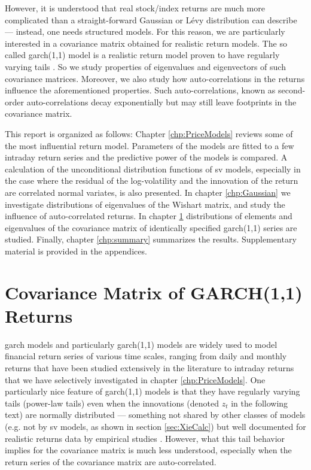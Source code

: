 \documentclass{report}
\begin{document}
However, it is understood that real stock/index returns are much more
complicated than a straight-forward Gaussian or L\'evy distribution can
describe --- instead, one needs structured models. For this reason, we
are particularly interested in a covariance matrix obtained for
realistic return models. The so called \gls{garch}(1,1) model is a realistic
return model proven to have regularly varying tails
\cite{mikosch2000}. So we study properties of eigenvalues and
eigenvectors of such covariance matrices. Moreover, we also study how
auto-correlations in the returns influence the aforementioned
properties. Such auto-correlations, known as second-order
auto-correlations decay exponentially but may still leave footprints
in the covariance matrix.

This report is organized as follows: Chapter \ref{chp:PriceModels}
reviews some of the most influential return model. Parameters of the
models are fitted to a few intraday return series and the predictive
power of the models is compared. A calculation of the
unconditional distribution functions of \gls{sv} models,
especially in the case where the residual of the log-volatility
and the innovation of the return are correlated normal variates, is
also presented. In chapter \ref{chp:Gaussian} we investigate
distributions of eigenvalues of the Wishart matrix, and study the
influence of auto-correlated returns. In chapter
\ref{chp:CrossCorrelationFat} distributions of elements and
eigenvalues of the covariance matrix of identically specified
\gls{garch}(1,1) series are studied. Finally, chapter \ref{chp:summary}
summarizes the results. Supplementary material is provided in the
appendices.




\chapter{Covariance Matrix of GARCH(1,1) Returns}
\label{chp:CrossCorrelationFat}
\gls{garch} models and particularly \gls{garch}(1,1) models are widely used to
model financial return series of various time scales, ranging from
daily and monthly returns that have been studied extensively in the
literature to intraday returns that we have selectively investigated
in chapter \ref{chp:PriceModels}. One particularly nice feature of
\gls{garch}(1,1) models is that they have regularly varying tails (power-law
tails) \cite{Mikosch2009, mikosch2000} even when the innovations
(denoted $z_t$ in the following text) are normally distributed ---
something not shared by other classes of models (e.g. not by
\gls{sv} models, as shown in section \ref{sec:XieCalc}) but well
documented for realistic returns data by empirical studies
\cite{Mantegna2000, Potters2003, Guhr2007}. However, what this tail
behavior implies for the covariance matrix is much less understood,
especially when the return series of the covariance matrix are
auto-correlated.
\end{document}
